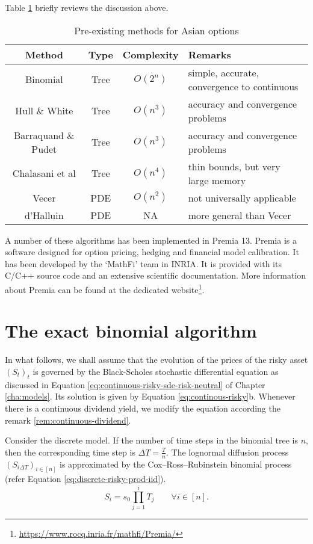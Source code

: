 Table \ref{tab:asian-literature-review} briefly reviews the discussion above.
\begin{table}[h]
	\centering
	\caption{Pre-existing methods for Asian options}
	\label{tab:asian-literature-review}
	\begin{tabular}{cccl}
		\toprule
		Method  &  Type  &  Complexity  &  Remarks  \\
		\midrule
		Binomial  &  Tree  &  $ O(2^n) $  &  simple, accurate, convergence to continuous  \\
		Hull \& White  &  Tree  &  $ O(n^3) $  &  accuracy and convergence problems  \\
		Barraquand \& Pudet  &  Tree  &  $ O(n^3) $  &  accuracy and convergence problems  \\
		Chalasani et al  &  Tree  &  $ O(n^4) $  &  thin bounds, but very large memory  \\
		Vecer  &  PDE  &  $ O(n^2) $  &  not universally applicable  \\
		d'Halluin  &  PDE  &  NA  &  more general than Vecer \\
		\bottomrule
	\end{tabular}
\end{table}


A number of these algorithms has been implemented in Premia 13. Premia is a software designed for option pricing, hedging and financial model calibration. It has been developed by the `MathFi' team in INRIA. It is provided with its C/C++ source code and an extensive scientific documentation. More information about Premia can be found at the dedicated  website\footnote{\url{https://www.rocq.inria.fr/mathfi/Premia/}}.


\section{The exact binomial algorithm}
\label{sec:asian-binom}
In what follows, we shall assume that the evolution of the prices of the risky asset $ (S_t)_t $ is governed by the Black-Scholes stochastic differential equation as discussed in Equation \ref{eq:continuous-risky-sde-risk-neutral} of Chapter \ref{cha:models}. Its solution is given by Equation \ref{eq:continous-risky}b. Whenever there is a continuous dividend yield, we modify the equation according the remark \ref{rem:continuous-dividend}.

Consider the discrete model. If the number of time steps in the binomial tree is $ n $, then the corresponding time step is $ \Delta T = \frac{T}{n} $. The lognormal diffusion process $ (S_{i \Delta T})_{i \in [n]} $ is approximated by the Cox–Ross–Rubinstein binomial process (refer Equation \ref{eq:discrete-risky-prod-iid}).
\begin{equation*}
	S_i = s_0 \prod_{j=1}^{i} T_j  \qquad  \forall i \in [n] .
\end{equation*}

